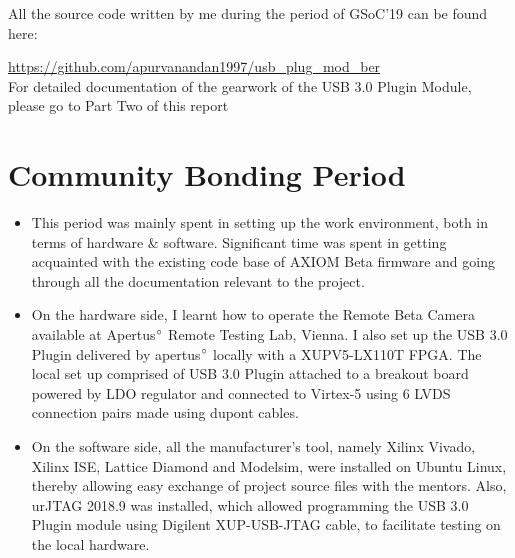 \documentclass[11pt,oneside,fleqn]{book} %
\begin{document}
All the source code written by me during the period of GSoC'19 can be found here: 


\textcolor{blue}{\url{https://github.com/apurvanandan1997/usb_plug_mod_ber} }
\\
For detailed documentation of the gearwork of the USB 3.0 Plugin Module, please go to Part Two of this report 

\section{Community Bonding Period}
\begin{itemize}
  \item This period was mainly spent in setting up the work environment, both in terms of hardware \& software. Significant time was spent in getting acquainted with the existing code base of AXIOM Beta firmware and going through all the documentation relevant to the project.
  \item On the hardware side, I learnt how to operate the Remote Beta Camera available at Apertus$\degree$ Remote Testing Lab, Vienna. I also set up the USB 3.0 Plugin delivered by apertus$\degree$ locally with a XUPV5-LX110T FPGA. The local set up comprised of USB 3.0 Plugin attached to a breakout board powered by LDO regulator and connected to Virtex-5 using 6 LVDS connection pairs made using dupont cables.
  \item On the software side, all the manufacturer's tool, namely Xilinx Vivado, Xilinx ISE, Lattice Diamond and Modelsim, were installed on Ubuntu Linux, thereby allowing easy exchange of project source files with the mentors. Also, urJTAG 2018.9 was installed, which allowed programming the USB 3.0 Plugin module using Digilent XUP-USB-JTAG cable, to facilitate testing on the local hardware.

\end{itemize}



\end{document}
